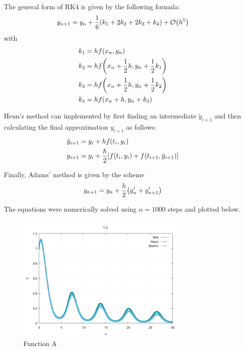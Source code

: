 \documentclass[12pt]{article}
\DeclarePairedDelimiter\rb{(}{)}
\DeclarePairedDelimiter\sqrb{[}{]}
\begin{document}
The general form of RK4 is given by the following formula:
\begin{align*}
    y_{n+1} & =  y_{n} + \frac{1}{6} \rb*{
    k_{1} + 2 k_{2} + 2 k_{3} + k_{4}} + \mathcal{O} \rb*{h^{5}} &\\
\end{align*}
with 
\begin{align*}
    k_{1} & =  h f \rb*{x_{n}, y_{n}} &\\
    k_{2} & =  h f \rb*{x_{n} + \frac{1}{2} h, y_{n} + \frac{1}{2} k_{1}}&\\
    k_{3} & =  h f \rb*{x_{n} + \frac{1}{2} h, y_{n} + \frac{1}{2} k_{2}} &\\
    k_{4} & = h f \rb*{x_{n} + h, y_{n} + k_{3}} &\\
\end{align*}

Heun's method can implemented by first finding an intermediate \(\tilde{y}_{i+1}\) and then calculating the final approximation \(y_{i+1}\) as follows:
\begin{align*}
    \tilde{y}_{i+1} & =  y_{i} + h f \rb*{t_{i}, y_{i}} &\\
    y_{i+1} & =  y_{i} + \frac{h}{2} \sqrb*{ f \rb*{t_{i}, y_{i}} + f \rb*{ t_{i+1} , \tilde{y}_{i+1}}} &\\
\end{align*}

Finally, Adams' method is given by the scheme
\begin{align*}
    y_{n+1} & =  y_{n} + \frac{h}{2} \rb*{y'_{n} + y'_{n+1} } &\\
\end{align*}

The equations were numerically solved using \(n = 1000\) steps and plotted below.

\begin{figure}[ht]
    \centering
    \includegraphics[width=0.75\textwidth]{./../problem2/data/f_a.png}
    \caption{Function A}
    \label{fig:fncA}
\end{figure}
\end{document}
